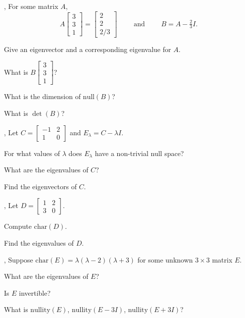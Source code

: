 \documentclass[letter]{article}
\newcommand{\nnul}{\mathrm{nullity}}
\newcommand{\mat}[1]{\begin{bmatrix}#1\end{bmatrix}}
\newcommand{\chr}{\mathrm{char}}
\renewcommand{\emph}[1]{{\color{defcolor} \textbf{\textit{##1}}}}
\begin{document}
	\vspace{-.4cm}
	\sep
	For some matrix $A$,
	\vspace{-.5cm}
	\[
		A\mat{3\\3\\1}=\mat{2\\2\\2/3}\qquad\text{ and }\qquad B=A-\tfrac{2}{3}I.
	\]
	\vspace{-.7cm}
	\begin{Enum}
		\item Give an eigenvector and a corresponding eigenvalue for $A$.
		\item What is $B\mat{3\\3\\1}$?
		\item What is the dimension of $\text{null}(B)$?
		\item What is $\det(B)$?
	\end{Enum}

	\vspace{-.4cm}
	\sep
	Let $C=\mat{-1&2\\1&0}$ and $E_\lambda = C-\lambda I$.
	\begin{Enum}
		\item For what values of $\lambda$ does $E_\lambda$ have a non-trivial
			null space?
		\item What are the eigenvalues of $C$?
		\item Find the eigenvectors of $C$.
	\end{Enum}
	
	\vspace{-.8cm}
	
	\sep
	Let $D=\mat{1&2\\3&0}$.
	\begin{Enum}
		\item Compute $\chr(D)$.
		\item Find the eigenvalues of $D$.
	\end{Enum}

	\vspace{-.4cm}
	\sep
	Suppose $\chr(E)=\lambda(\lambda -2)(\lambda +3)$ for some unknown $3\times 3$
	matrix $E$.
	\begin{Enum}
		\item What are the eigenvalues of $E$?
		\item Is $E$ invertible?
		\item What is $\nnul(E)$, $\nnul(E-3I)$, $\nnul(E+3I)$?
	\end{Enum}
\end{document}

